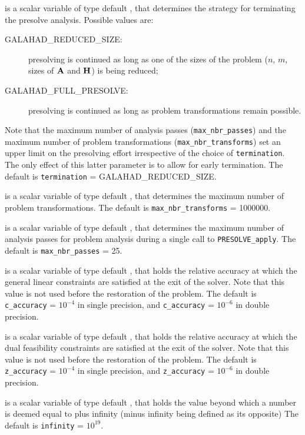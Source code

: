 \documentclass{galahad}
\newcommand{\packagename}{PRESOLVE}
\newcommand{\sym}{\sf\small}
\begin{document}
\begin{description}
 is a scalar variable of type default \integer, that
determines the strategy for terminating the presolve analysis.  
Possible values are:
\begin{description}
\item[\sym GALAHAD\_REDUCED\_SIZE:]  presolving is continued as long as one of
            the sizes of the problem ($n$, $m$, sizes of ${\mathbf{A}}$ and ${\mathbf{H}}$) is
            being reduced;
\item[\sym GALAHAD\_FULL\_PRESOLVE:] presolving is continued as long as problem
            transformations remain possible.
\end{description}
Note that the maximum number of analysis passes ({\tt max\_nbr\_passes})  and
the maximum number of problem transformations ({\tt max\_nbr\_transforms})  
set an upper limit on the  presolving effort irrespective of the choice of
{\tt termination}. The only effect of this latter parameter is to allow for
early termination. 
The default is {\tt termination} = {\sym GALAHAD\_REDUCED\_SIZE}.

 is a scalar variable of type default \integer, that
determines the maximum number of problem transformations.
The default is {\tt max\_nbr\_transforms} = 1000000.

 is a scalar variable of type default \integer, that
determines the maximum number of analysis passes for problem analysis
during a single call to {\tt \packagename\_apply}.
The default is {\tt max\_nbr\_passes} = 25.

 is a scalar variable of type default \realdp, that holds the
relative accuracy at which the general linear constraints are satisfied at 
the exit of the solver. Note that this value is not used before the restoration
of the problem.
The default is {\tt c\_accuracy} = $10^{-4}$ in single precision, and
{\tt c\_accuracy} = $10^{-6}$ in double precision.

 is a scalar variable of type default \realdp, that holds the
relative accuracy at which the dual feasibility constraints are satisfied at
the exit of the solver. Note that this value is not used before the restoration
of the problem.
The default is {\tt z\_accuracy} = $10^{-4}$ in single precision, and
{\tt z\_accuracy} = $10^{-6}$ in double precision.

 is a scalar variable of type default \realdp, that holds the
value beyond which a number is deemed equal to plus infinity 
(minus infinity being defined as its opposite)
The default is {\tt infinity} = $10^{19}$.


\end{description}
\end{document}
